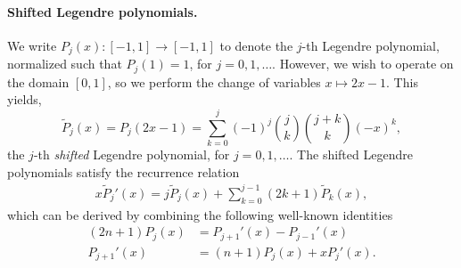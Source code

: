 \documentclass{article}
\theoremstyle{definition}
\newcommand{\pr}[1]{ \left( #1 \right) }
\begin{document}

\paragraph{Shifted Legendre polynomials.}
We write $P_j(x) \colon [-1,1] \to [-1,1]$ to denote the $j$-th Legendre polynomial, normalized such that $P_j(1)=1$, for $j=0,1,\dots$.
However, we wish to operate on the domain $[0,1]$, so we perform the change of variables $x \mapsto 2x-1$.
This yields, 
\[
\tilde{P}_j(x)=  P_j(2x-1) = \sum_{k=0}^j (-1)^j \binom{j}{k} \binom{j+k}{k} (-x)^k,
\]
the $j$-th \emph{shifted} Legendre polynomial, for $j=0,1,\dots$. The shifted Legendre polynomials satisfy the recurrence relation
\begin{align} \label{eq:shifted_legen_rel}
    x\tilde{P}_j'(x) = j\tilde{P}_j(x) + \sum_{k=0}^{j-1}(2k+1)\tilde{P}_k(x),
\end{align}
which can be derived by combining the following well-known identities \citep{arfken2011mathematical}
\begin{align*}
    (2n + 1)P_j(x) &= P_{j+1}'(x) - P_{j-1}'(x) \\
    P_{j+1}'(x) &= (n+1)P_j(x) + xP_j'(x).
\end{align*}






\end{document}
